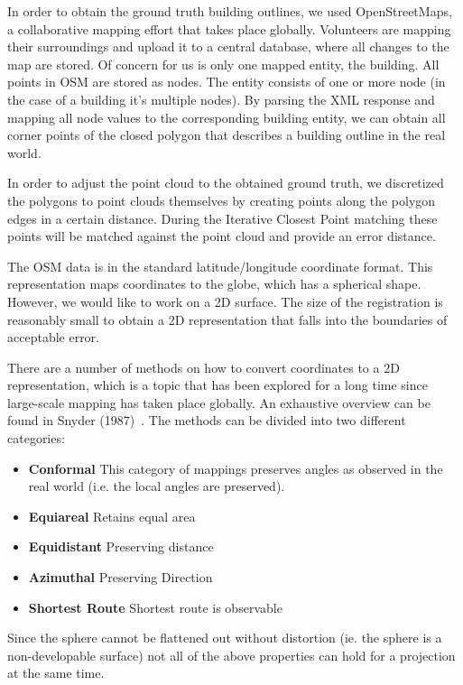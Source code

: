 \documentclass[10pt,twocolumn,letterpaper]{article}
\begin{document}
In order to obtain the ground truth building outlines, we used OpenStreetMaps, a collaborative mapping effort that takes place globally. Volunteers are mapping their surroundings and upload it to a central database, where all changes to the map are stored. 
Of concern for us is only one mapped entity, the building. All points in OSM are stored as nodes. The entity consists of one or more node (in the case of a building it's multiple nodes). By parsing the XML response and mapping all node values to the corresponding building entity, we can obtain all corner points of the closed polygon that describes a building outline in the real world.

In order to adjust the point cloud to the obtained ground truth, we discretized the polygons to point clouds themselves by creating points along the polygon edges in a certain distance. During the Iterative Closest Point matching these points will be matched against the point cloud and provide an error distance.

The OSM data is in the standard latitude/longitude coordinate format. This representation maps coordinates to the globe, which has a spherical shape. However, we would like to work on a 2D surface. The size of the registration is reasonably small to obtain a 2D representation that falls into the boundaries of acceptable error.

There are a number of methods on how to convert coordinates to a 2D representation, which is a topic that has been explored for a long time since large-scale mapping has taken place globally. An exhaustive overview can be found in Snyder (1987)~\cite{Snyder1987}. The methods can be divided into two different categories:

\begin{itemize}
   \item \textbf{Conformal} This category of mappings preserves angles as observed in the real world (i.e. the local angles are preserved). 
   \item \textbf{Equiareal} Retains equal area
   \item \textbf{Equidistant} Preserving distance
   \item \textbf{Azimuthal} Preserving Direction
   \item \textbf{Shortest Route} Shortest route is observable 
\end{itemize}

Since the sphere cannot be flattened out without distortion (ie. the sphere is a non-developable surface) not all of the above properties can hold for a projection at the same time.
\end{document}

